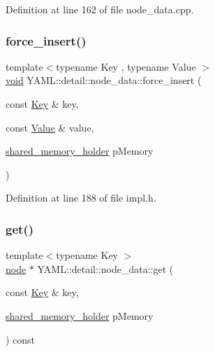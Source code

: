 Definition at line 162 of file node\+\_\+data.\+cpp.

\mbox{\label{class_y_a_m_l_1_1detail_1_1node__data_a6811d89b2b41ed4bca74242ddb61127e}} 
\subsubsection{\texorpdfstring{force\_insert()}{force\_insert()}}
{\footnotesize\ttfamily template$<$typename Key , typename Value $>$ \\
\mbox{\hyperlink{glad_8h_a950fc91edb4504f62f1c577bf4727c29}{void}} Y\+A\+M\+L\+::detail\+::node\+\_\+data\+::force\+\_\+insert (\begin{DoxyParamCaption}\item[{const \mbox{\hyperlink{namespace_y_a_m_l_a67c320aa50d3de7ecba1d0b8775dd684a1af533fc24b0311b8c4d5ac2870283aa}{Key}} \&}]{key,  }\item[{const \mbox{\hyperlink{namespace_y_a_m_l_a67c320aa50d3de7ecba1d0b8775dd684a0d29a86853d6a9cfe0241ab7ea8da97c}{Value}} \&}]{value,  }\item[{\mbox{\hyperlink{namespace_y_a_m_l_1_1detail_a228c4b3b6ba1058b474d40afc218e21d}{shared\+\_\+memory\+\_\+holder}}}]{p\+Memory }\end{DoxyParamCaption})\hspace{0.3cm}{\ttfamily [inline]}}



Definition at line 188 of file impl.\+h.

\mbox{\label{class_y_a_m_l_1_1detail_1_1node__data_a6943f32eb9e9029c533b369286bb5123}} 
\subsubsection{\texorpdfstring{get()}{get()}\hspace{0.1cm}{\footnotesize\ttfamily [1/4]}}
{\footnotesize\ttfamily template$<$typename Key $>$ \\
\mbox{\hyperlink{class_y_a_m_l_1_1detail_1_1node}{node}} $\ast$ Y\+A\+M\+L\+::detail\+::node\+\_\+data\+::get (\begin{DoxyParamCaption}\item[{const \mbox{\hyperlink{namespace_y_a_m_l_a67c320aa50d3de7ecba1d0b8775dd684a1af533fc24b0311b8c4d5ac2870283aa}{Key}} \&}]{key,  }\item[{\mbox{\hyperlink{namespace_y_a_m_l_1_1detail_a228c4b3b6ba1058b474d40afc218e21d}{shared\+\_\+memory\+\_\+holder}}}]{p\+Memory }\end{DoxyParamCaption}) const\hspace{0.3cm}{\ttfamily [inline]}}



